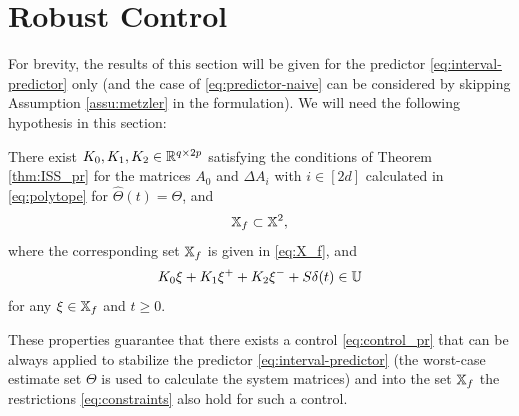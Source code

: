\documentclass[letterpaper, 10 pt, conference]{ieeeconf}  %
\begin{document}
\section{\label{sec:control} Robust Control}

For brevity, the results of this section will be given for the predictor
\eqref{eq:interval-predictor} only (and the case of \eqref{eq:predictor-naive}
can be considered by skipping Assumption \ref{assu:metzler} in the
formulation). We will need the following hypothesis in this section:
\begin{assumption}
\label{assu:ctrl} There exist $K_{0},K_{1},K_{2}\in\mathbb{R}^{q\times2p}$
satisfying the conditions of Theorem \ref{thm:ISS_pr} for the matrices
$A_{0}$ and $\Delta A_{i}$ with $i\in[2d]$ calculated in \eqref{eq:polytope}
for $\hat{\Theta}(t)=\Theta$, and
\[
\mathbb{X}_{f}\subset\mathbb{X}^{2},
\]
where the corresponding set $\mathbb{X}_{f}$ is given in \eqref{eq:X_f},
and
\[
K_{0}\xi+K_{1}\xi^{+}+K_{2}\xi^{-}+S\delta(t)\in\mathbb{U}
\]
for any $\xi\in\mathbb{X}_{f}$ and $t\geq0$.
\end{assumption}
These properties guarantee that there exists a control \eqref{eq:control_pr}
that can be always applied to stabilize the predictor \eqref{eq:interval-predictor}
(the worst-case estimate set $\Theta$ is used to calculate the system
matrices) and into the set $\mathbb{X}_{f}$ the restrictions \eqref{eq:constraints}
also hold for such a control.
\end{document}
